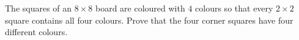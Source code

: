 The squares of an $8\times8$ board are coloured with $4$ colours so that every $2\times2$ square contains all four colours. Prove that the four corner squares have four different colours.
